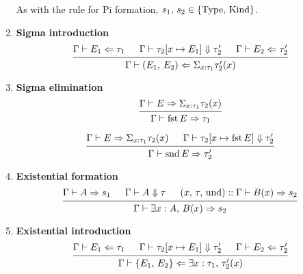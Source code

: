 \documentclass{article}
\begin{document}
\begin{enumerate}
  As with the rule for Pi formation, $s_1, \, s_2 \in \{\operatorname{Type}, \, \operatorname{Kind}\}$.

\item \textbf{Sigma introduction} \\
  \[
    \begin{prooftree}
      \hypo{\Gamma \vdash E_1 \Leftarrow \tau_1}
      \hypo{\Gamma \vdash \tau_2[x \mapsto E_1] \Downarrow \tau_2'}
      \hypo{\Gamma \vdash E_2 \Leftarrow \tau_2'}
      \infer3{\Gamma \vdash (E_1, \, E_2) \Leftarrow 
        \Sigma_{x : \tau_1}\tau_2'(x)}
    \end{prooftree}
  \]
  
\item \textbf{Sigma elimination} \\
  \[
    \begin{prooftree}
      \hypo{\Gamma \vdash E \Rightarrow \Sigma_{x : \tau_1}\tau_2(x)}
      \infer1{\Gamma \vdash \fst E \Rightarrow \tau_1}
    \end{prooftree}
  \]

  \[
    \begin{prooftree}
      \hypo{\Gamma \vdash E \Rightarrow \Sigma_{x : \tau_1}\tau_2(x)}
      \hypo{\Gamma \vdash \tau_2[x \mapsto \fst E] \Downarrow \tau_2'}
      \infer2{\Gamma \vdash \snd E \Rightarrow \tau_2'}
    \end{prooftree}
  \]

\item \textbf{Existential formation} \\
\[
    \begin{prooftree}
      \hypo{\Gamma \vdash A \Rightarrow s_1}
      \hypo{\Gamma \vdash A \Downarrow \tau}
      \hypo{(x, \, \tau, \, \text{und}) :: \Gamma \vdash B(x) \Rightarrow s_2}
      \infer3{\Gamma \vdash \exists x : A, \, B(x) \Rightarrow s_2}
    \end{prooftree}
\]

\item \textbf{Existential introduction} \\
\[
    \begin{prooftree}
      \hypo{\Gamma \vdash E_1 \Leftarrow \tau_1}
      \hypo{\Gamma \vdash \tau_2[x \mapsto E_1] \Downarrow \tau_2'}
      \hypo{\Gamma \vdash E_2 \Leftarrow \tau_2'}
      \infer3{\Gamma \vdash \{E_1, \, E_2\} \Leftarrow 
        \exists x : \tau_1, \, \tau_2'(x)}
    \end{prooftree}
\]


\end{enumerate}
\end{document}
